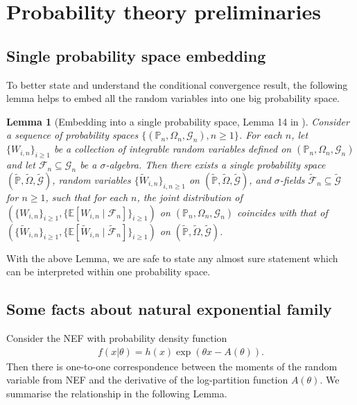 \documentclass[12pt]{article}
\newtheorem{lemma}{Lemma}
\theoremstyle{definition}
\def\P{\mathbb{P}}
\def\P{\mathbb{P}}
\newcommand{\E}{\mathbb E}								%
\renewcommand{\P}{\mathbb{P}}							%
\begin{document}
\printbibliography

\clearpage

\appendix


\section{Probability theory preliminaries}

\subsection{Single probability space embedding}
To better state and understand the conditional convergence result, the following lemma helps to embed all the random variables into one big probability space.

\begin{lemma}[Embedding into a single probability space, Lemma 14 in \cite{Niu2022a}]\label{lem:embedding}
	Consider a sequence of probability spaces $\{(\P_n,\Omega_n,\mathcal{G}_n),n \geq 1\}$. For each $n$, let $\{W_{i,n}\}_{i \geq 1}$ be a collection of integrable random variables defined on $(\P_n,\Omega_n,\mathcal{G}_n)$ and let $\mathcal F_n \subseteq \mathcal G_n$ be a $\sigma$-algebra. Then there exists a single probability space $(\widetilde{\P}, \widetilde{\Omega}, \widetilde{\mathcal G})$, random variables $\{\widetilde W_{i,n}\}_{i,n \geq 1}$ on $(\widetilde{\P}, \widetilde{\Omega}, \widetilde{\mathcal G})$, and $\sigma$-fields $\widetilde{\mathcal F}_n \subseteq \widetilde{\mathcal G}$ for $n \geq 1$, such that for each $n$, the joint distribution of $(\{W_{i,n}\}_{i \geq 1}, \{\E[W_{i,n}\mid\mathcal F_n]\}_{i \geq 1})$ on $(\P_n,\Omega_n,\mathcal{G}_n)$ coincides with that of $(\{\widetilde W_{i,n}\}_{i \geq 1}, \{\E[\widetilde W_{i,n}\mid \widetilde{\mathcal F}_n]\}_{i \geq 1})$ on $(\widetilde{\P}, \widetilde{\Omega}, \widetilde{\mathcal G})$.
\end{lemma}
\noindent With the above Lemma, we are safe to state any almost sure statement which can be interpreted within one probability space. 

\subsection{Some facts about natural exponential family}

Consider the NEF with probability density function
\begin{align*}
  f(x|\theta)=h(x)\exp(\theta x-A(\theta)).
\end{align*}
Then there is one-to-one correspondence between the moments of the random variable from NEF and the derivative of the log-partition function $A(\theta)$. We summarise the relationship in the following Lemma.
\end{document}
